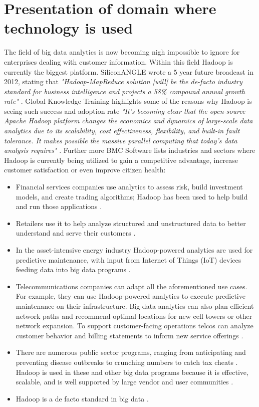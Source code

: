 \documentclass[a4paper,english]{report}
\begin{document}
	\section{Presentation of domain where technology is used}
		The field of big data analytics is now becoming nigh impossible to ignore for enterprises dealing with customer information. Within this field Hadoop is currently the biggest platform. SiliconANGLE wrote a 5 year future broadcast in 2012, stating that \textit{"Hadoop-MapReduce solution [will] be the de-facto industry standard for business intelligence and projects a 58\% compound annual growth rate"} \cite{siliconA}.
		Global Knowledge Training highlights some of the reasons why Hadoop is seeing such success and adoption rate
		\textit{"It's becoming clear that the open-source Apache Hadoop platform changes the economics and dynamics of large-scale data analytics due to its scalability, cost effectiveness, flexibility, and built-in fault tolerance. It makes possible the massive parallel computing that today's data analysis requires"} \cite{globalknowledge}.
		Further more BMC Software lists industries and sectors where Hadoop is currently being utilized to gain a competitive advantage, increase customer satisfaction or even improve citizen health:
		\begin{itemize}
			\item Financial services companies use analytics to assess risk, build investment models, and create trading algorithms; Hadoop has been used to help build and run those applications \cite{bmc}.
			\item Retailers use it to help analyze structured and unstructured data to better understand and serve their customers \cite{bmc}.
			\item In the asset-intensive energy industry Hadoop-powered analytics are used for predictive maintenance, with input from Internet of Things (IoT) devices feeding data into big data programs \cite{bmc}.
			\item Telecommunications companies can adapt all the aforementioned use cases. For example, they can use Hadoop-powered analytics to execute predictive maintenance on their infrastructure. Big data analytics can also plan efficient network paths and recommend optimal locations for new cell towers or other network expansion. To support customer-facing operations telcos can analyze customer behavior and billing statements to inform new service offerings \cite{bmc}.
			\item There are numerous public sector programs, ranging from anticipating and preventing disease outbreaks to crunching numbers to catch tax cheats \cite{bmc}.
			Hadoop is used in these and other big data programs because it is effective, scalable, and is well supported by large vendor and user communities \cite{bmc}.
			\item Hadoop is a de facto standard in big data \cite{bmc}.
		\end{itemize}
	
\end{document}

